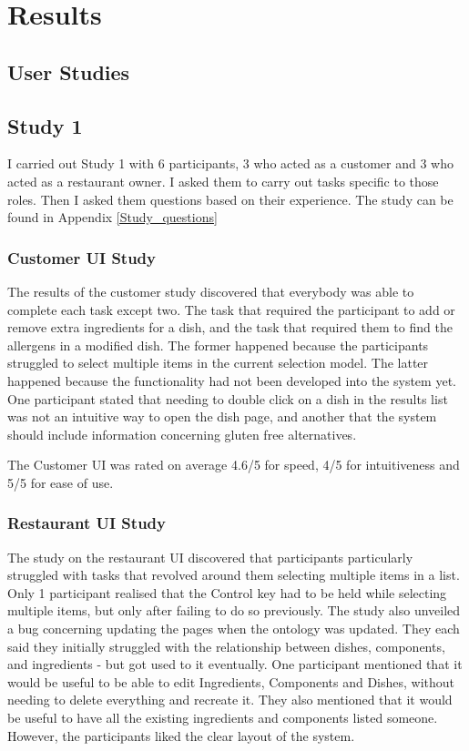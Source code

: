 \chapter{Results}

\section{User Studies}

\section{Study 1}
\label{section:Study1Results}

I carried out Study 1 with 6 participants, 3 who acted as a customer and 3 who acted as a restaurant owner. I asked them to carry out tasks specific to those roles. Then I asked them questions based on their experience. The study can be found in Appendix \ref{Study_questions}

\subsection{Customer UI Study}

The results of the customer study discovered that everybody was able to complete each task except two. The task that required the participant to add or remove extra ingredients for a dish, and the task that required them to find the allergens in a modified dish. The former happened because the participants struggled to select multiple items in the current selection model. The latter happened because the functionality had not been developed into the system yet. One participant stated that needing to double click on a dish in the results list was not an intuitive way to open the dish page, and another that the system should include information concerning gluten free alternatives.

The Customer UI was rated on average 4.6/5 for speed, 4/5 for intuitiveness and 5/5 for ease of use.

\subsection{Restaurant UI Study}

The study on the restaurant UI discovered that participants particularly struggled with tasks that revolved around them selecting multiple items in a list. Only 1 participant realised that the Control key had to be held while selecting multiple items, but only after failing to do so previously. The study also unveiled a bug concerning updating the pages when the ontology was updated. They each said they initially struggled with the relationship between dishes, components, and ingredients - but got used to it eventually. One participant mentioned that it would be useful to be able to edit Ingredients, Components and Dishes, without needing to delete everything and recreate it. They also mentioned that it would be useful to have all the existing ingredients and components listed someone. However, the participants liked the clear layout of the system. 

